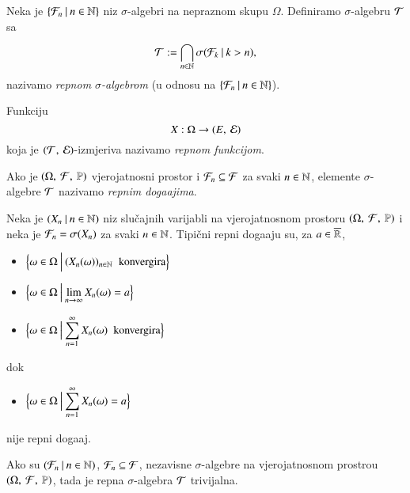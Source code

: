 \begin{defn}    \label{defn:9.7}
    Neka je $\{{\mathcal{F}_n} \: | \: {n \in \mathbb{N}}\}$ niz $\sigma$-algebri na nepraznom skupu $\Omega$.
    Definiramo $\sigma$-algebru $\mathcal{T}$ sa
    \begin{equation*}
        \mathcal{T} := \bigcap\limits_{n \in \mathbb{N}}^{} \sigma({\mathcal{F}_k} \: | \: {k > n}),
    \end{equation*}
    nazivamo \emph{repnom $\sigma$-algebrom} (u odnosu na $\{{\mathcal{F}_n} \: | \: {n \in \mathbb{N}}\}$).

    Funkciju
    \begin{equation*}
        X : \Omega \to ({E}, \: {\mathcal{E}})
    \end{equation*}
    koja je $({\mathcal{T}}, \: {\mathcal{E}})$-izmjeriva nazivamo \emph{repnom funkcijom}.

    Ako je $(\Omega, \: \mathcal{F}, \: \mathbb{P})$ vjerojatnosni prostor i $\mathcal{F}_n \subseteq \mathcal{F}$ za svaki $n \in \mathbb{N}$, elemente $\sigma$-algebre $\mathcal{T}$ nazivamo \emph{repnim doga\dj ajima}.
\end{defn}

\begin{pr}  \label{pr:9.8}
    Neka je $({X_n} \: | \: {n \in \mathbb{N}})$ niz slu\v cajnih varijabli na vjerojatnosnom prostoru $(\Omega, \: \mathcal{F}, \: \mathbb{P})$ i neka je $\mathcal{F}_n = \sigma({X_n})$ za svaki $n \in \mathbb{N}$.
    Tipi\v cni repni doga\dj aju su, za $a \in \overline{\mathbb{R}}$,
    \begin{itemize}
        \item[] $\displaystyle \Big\{ {\omega \in \Omega} \: \Big| \: {(X_n(\omega))_{n \in \mathbb{N}} \; \textnormal{ konvergira}} \Big\}$
        \item[] $\displaystyle \Big\{ {\omega \in \Omega} \: \Big| \: {\lim\limits_{n \to \infty} X_n(\omega) = a} \Big\}$
        \item[] $\displaystyle \Big\{ {\omega \in \Omega} \: \Big| \: {\sum\limits_{n = 1}^{\infty} X_n(\omega) \; \textnormal{ konvergira}} \Big\}$
    \end{itemize}
    dok
    \begin{itemize}
        \item[] $\displaystyle \Big\{ {\omega \in \Omega} \: \Big| \: {\sum\limits_{n = 1}^{\infty} X_n (\omega) = a} \Big\}$
    \end{itemize}
    nije repni doga\dj aj.
\end{pr}

\begin{tm}  \label{tm:9.9}
    Ako su $({\mathcal{F}_n} \: | \: {n \in \mathbb{N}})$, $\mathcal{F}_n \subseteq \mathcal{F}$, nezavisne $\sigma$-algebre na vjerojatnosnom prostrou $(\Omega, \: \mathcal{F}, \: \mathbb{P})$, tada je repna $\sigma$-algebra $\mathcal{T}$ trivijalna.
\end{tm}

